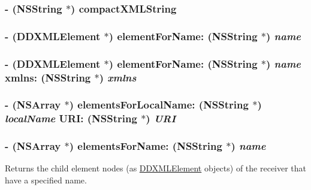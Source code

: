\label{class_d_d_x_m_l_element_a945ca3ee8a11c606522baca7f7766211}
\hypertarget{class_d_d_x_m_l_element_a513554279bf1540388cfdce854728211}{
\subsubsection[{compactXMLString}]{\setlength{\rightskip}{0pt plus 5cm}-\/ ({\bf NSString} $\ast$) compactXMLString }}
\label{class_d_d_x_m_l_element_a513554279bf1540388cfdce854728211}
\hypertarget{class_d_d_x_m_l_element_a07d653b036803ab01ec0cc6ed093e566}{
\subsubsection[{elementForName:}]{\setlength{\rightskip}{0pt plus 5cm}-\/ ({\bf DDXMLElement} $\ast$) elementForName: ({\bf NSString} $\ast$) {\em name}}}
\label{class_d_d_x_m_l_element_a07d653b036803ab01ec0cc6ed093e566}
\hypertarget{class_d_d_x_m_l_element_a22aa4e3343d528455683da8da7aa48d7}{
\subsubsection[{elementForName:xmlns:}]{\setlength{\rightskip}{0pt plus 5cm}-\/ ({\bf DDXMLElement} $\ast$) elementForName: ({\bf NSString} $\ast$) {\em name}\/ xmlns: ({\bf NSString} $\ast$) {\em xmlns}}}
\label{class_d_d_x_m_l_element_a22aa4e3343d528455683da8da7aa48d7}
\hypertarget{class_d_d_x_m_l_element_af696a4dbd32420584dfc06060ae9f9b8}{
\subsubsection[{elementsForLocalName:URI:}]{\setlength{\rightskip}{0pt plus 5cm}-\/ (NSArray $\ast$) elementsForLocalName: ({\bf NSString} $\ast$) {\em localName}\/ URI: ({\bf NSString} $\ast$) {\em URI}}}
\label{class_d_d_x_m_l_element_af696a4dbd32420584dfc06060ae9f9b8}
\hypertarget{class_d_d_x_m_l_element_a2fbddbefc549e7846f190bb44120986f}{
\subsubsection[{elementsForName:}]{\setlength{\rightskip}{0pt plus 5cm}-\/ (NSArray $\ast$) elementsForName: ({\bf NSString} $\ast$) {\em name}}}
\label{class_d_d_x_m_l_element_a2fbddbefc549e7846f190bb44120986f}
Returns the child element nodes (as \hyperlink{class_d_d_x_m_l_element}{DDXMLElement} objects) of the receiver that have a specified name.

